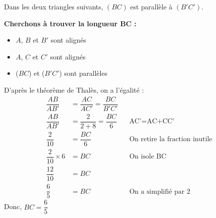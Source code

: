 \exmpl
{Dans les deux triangles suivants, $(BC)$ est parallèle à $(B'C')$.\\
\begin{minipage}{0.45\textwidth}
    \begin{figure}[H]
        \centering
    \end{figure} 
    \textbf{Cherchons à trouver la longueur BC :}
    \begin{itemize}
        \item $A$, $B$ et $B'$ sont alignés
        \item $A$, $C$ et $C'$ sont alignés
        \item ($BC$) et ($B'C'$) sont parallèles
    \end{itemize}
    D'après le théorème de Thalès, on a l'égalité : 
    \begin{align*}
        \dfrac{AB}{AB'}&=\dfrac{AC}{AC'}=\dfrac{BC}{B'C'}&&\\
        \dfrac{AB}{AB'}&=\dfrac{2}{2+8}=\dfrac{BC}{6}&&\text{AC'=AC+CC'}\\
        \dfrac{2}{10}&=\dfrac{BC}{6}&&\text{On retire la fraction inutile}\\
        \dfrac{2}{10}\times 6&=BC&&\text{On isole BC}\\
        \dfrac{12}{10}&=BC&&\\
        \dfrac{6}{5}&=BC&&\text{On a simplifié par 2}
    \end{align*}
    Donc, $BC=\dfrac{6}{5}$
\end{minipage}
\hfill
\begin{minipage}{0.45\textwidth}
    \begin{figure}[H]
        \centering
        \begin{tikzpicture}[scale=1.5]

\end{tikzpicture}
\end{figure}
\end{minipage}}
